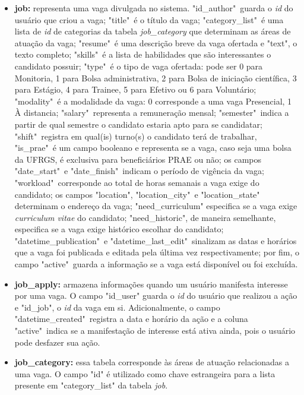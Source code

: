 \documentclass[cic,tc]{iiufrgs}
\begin{document}
\begin{itemize}
    \item \textbf{job:} representa uma vaga divulgada no sistema. "id\_author"\ guarda o \textit{id} do usuário que criou a vaga; "title"\ é o título da vaga; "category\_list"\ é uma lista de \textit{id} de categorias da tabela \textit{job\_category} que determinam as áreas de atuação da vaga; "resume"\ é uma descrição breve da vaga ofertada e "text", o texto completo; "skills"\ é a lista de habilidades que são interessantes o candidato possuir; "type"\ é o tipo de vaga ofertada: pode ser 0 para Monitoria, 1 para Bolsa administrativa, 2 para Bolsa de iniciação científica, 3 para Estágio, 4 para Trainee, 5 para Efetivo ou 6 para Voluntário; "modality"\ é a modalidade da vaga: 0 corresponde a uma vaga Presencial, 1 À distancia; "salary"\ representa a remuneração mensal; "semester"\ indica a partir de qual semestre o candidato estaria apto para se candidatar; "shift"\ registra em qual(is)  turno(s) o candidato terá de trabalhar, "is\_prae"\ é um campo booleano e representa se a vaga, caso seja uma bolsa da UFRGS, é exclusiva para beneficiários PRAE ou não; os campos "date\_start"\ e "date\_finish"\ indicam o período de vigência da vaga; "workload"\ corresponde ao total de horas semanais a vaga exige do candidato; os campos "location", "location\_city"\ e "location\_state" determinam o endereço da vaga; "need\_curriculum" especifica se a vaga exige \textit{curriculum vitae} do candidato; "need\_historic", de maneira semelhante, especifica se a vaga exige histórico escolhar do candidato; "datetime\_publication"\ e "datetime\_last\_edit"\ sinalizam as datas e horários que a vaga foi publicada e editada pela última vez respectivamente; por fim, o campo "active"\ guarda a informação se a vaga está disponível ou foi excluída.
    
    \item \textbf{job\_apply:} armazena informações quando um usuário manifesta interesse por uma vaga. O campo "id\_user" guarda o \textit{id} do usuário que realizou a ação e "id\_job", o \textit{id} da vaga em si. Adicionalmente, o campo "datetime\_created"\ registra a data e horário da ação e a coluna "active"\ indica se a manifestação de interesse está ativa ainda, pois o usuário pode desfazer sua ação.
    
    \item \textbf{job\_category:} essa tabela corresponde às áreas de atuação relacionadas a uma vaga. O campo "id" é utilizado como chave estrangeira para a lista presente em "category\_list" da tabela \textit{job}. 
    

\end{itemize}
\end{document}
